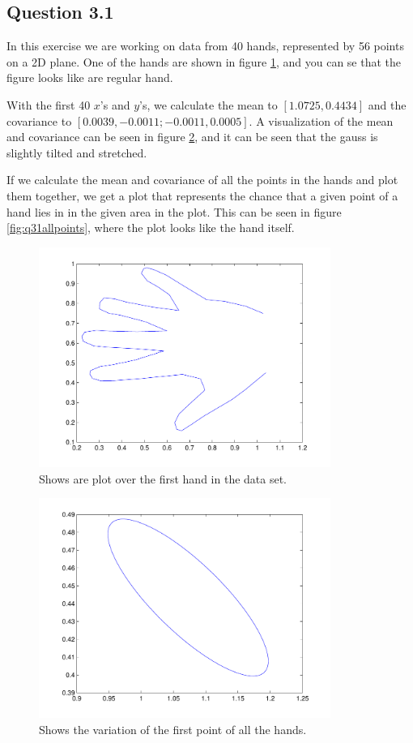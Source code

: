 \subsection*{Question 3.1}
In this exercise we are working on data from 40 hands, represented by 56
points on a 2D plane. One of the hands are shown in figure
\ref{fig:q31hand}, and you can se that the figure looks like are regular
hand.

With the first 40 $x$'s and $y$'s, we calculate the mean to $[1.0725, 0.4434]$ and the covariance to $[0.0039, -0.0011;
-0.0011, 0.0005]$. A visualization of the mean and covariance can be
seen in figure \ref{fig:q31onepoint}, and it can be seen that the gauss
is slightly tilted and stretched.

If we calculate the mean and covariance of all the points in the hands and
plot them together, we get a plot that represents the chance that a given
point of a hand lies in in the given area in the plot. This can be seen in
figure \ref{fig:q31allpoints}, where the plot looks like the hand itself.

\begin{figure}[!htbp]
  \centering
  \includegraphics[width=0.85\textwidth]{./images/q31_hand}
  \caption{Shows are plot over the first hand in the data set.}
  \label{fig:q31hand}
\end{figure}

\begin{figure}[!htbp]
  \centering
  \includegraphics[width=0.85\textwidth]{./images/q31_2}
  \caption{Shows the variation of the first point of all the hands.}
  \label{fig:q31onepoint}
\end{figure}

